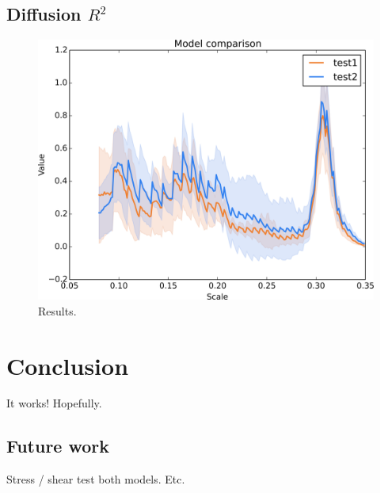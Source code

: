 \documentclass[aps,pre,twocolumn,letterpaper,floatfix,showpacs]{revtex4}
\begin{document}
\subsection{Diffusion $R^2$}
\begin{figure}
\includegraphics[width=.5\textwidth]{compare.png}
\caption{Results. }
\label{fig:model12}
\end{figure}

\section{Conclusion}
It works! Hopefully.
\subsection{Future work}
Stress / shear test both models. Etc.







\end{document}
